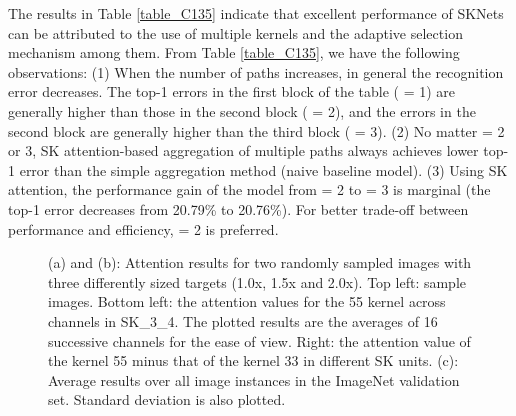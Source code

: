 \documentclass[10pt,twocolumn,letterpaper]{article}
\begin{document}
	
	The results in Table \ref{table_C135} indicate that excellent performance of SKNets can be attributed to the use of multiple kernels and the adaptive selection mechanism among them.
	From Table \ref{table_C135}, we have the following observations: (1)
	When the number of paths  increases, in general the recognition error decreases. The top-1 errors in the first block of the table ( = 1) are generally higher than those in the second block ( = 2), and the errors in the second block are generally higher than the third block ( = 3). 
	(2) No matter  = 2 or 3, SK attention-based aggregation of multiple paths always achieves lower top-1 error than the simple aggregation method (naive baseline model). 
	(3) Using SK attention, the performance gain of the model from  = 2 to  = 3 is marginal (the top-1 error decreases from 20.79\% to 20.76\%). For better trade-off between performance and efficiency,  = 2 is preferred.
	
	
	\begin{figure}[t]
		\begin{center}
			\setlength{\fboxrule}{0pt}
			\vspace{-4pt}
			\vspace{-4pt}
			\vspace{-4pt}
			
		\end{center}	
		\vspace{-4pt}
		\caption{(a) and (b): Attention results for two randomly sampled images with three differently sized targets (1.0x, 1.5x and 2.0x). Top left: sample images. Bottom left: the attention values for the 55 kernel across channels in SK\_3\_4.  The plotted results are the averages of 16 successive channels for the ease of view. Right: the attention value of the kernel 55 minus that of the kernel 33 in different SK units. (c): Average results over all image instances in the ImageNet validation set. Standard deviation is also plotted.}
		\vspace{-10pt}
		\label{fig_show}
	\end{figure}
	
\end{document}
